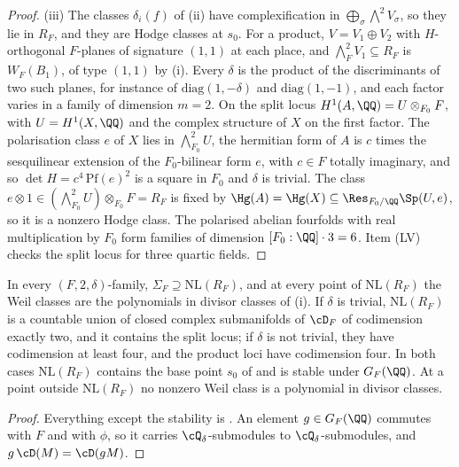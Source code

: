 \begin{proof}
(iii) The classes $\delta_{i}(f)$ of (ii) have
complexification in $\bigoplus_{\sigma}\bigwedge^{2}V_{\sigma}$, so they lie in
$R_{F}$, and they are Hodge classes at $s_{0}$. For a product,
$V=V_{1}\oplus V_{2}$ with $H$-orthogonal $F$-planes of signature $(1,1)$ at
each place, and $\bigwedge^{2}_{F}V_{1}\subseteq R_{F}$ is $W_{F}(B_{1})$, of
type $(1,1)$ by (i). Every $\delta$ is the product of the
discriminants of two such planes, for instance of $\mathrm{diag}(1,-\delta)$
and $\mathrm{diag}(1,-1)$, and each factor varies in a family of dimension
$m=2$. On the split locus $H^{1}(A,\QQ)=U\otimes_{F_{0}}F$, with
$U=H^{1}(X,\QQ)$ and the complex structure of $X$ on the first factor. The
polarisation class $e$ of $X$ lies in $\bigwedge^{2}_{F_{0}}U$, the hermitian
form of $A$ is $c$ times the sesquilinear extension of the $F_{0}$-bilinear
form $e$, with $c\in F$ totally imaginary, and so $\det H=c^{4}\,\mathrm{Pf}(e)^{2}$
is a square in $F_{0}$ and $\delta$ is trivial. The class
$e\otimes1\in(\bigwedge^{2}_{F_{0}}U)\otimes_{F_{0}}F=R_{F}$ is fixed by
$\Hg(A)=\Hg(X)\subseteq\Res_{F_{0}/\QQ}\Sp(U,e)$, so it is a nonzero Hodge
class. The polarised abelian fourfolds with real multiplication by $F_{0}$
form families of dimension $[F_{0}:\QQ]\cdot3=6$. Item (LV) checks the split
locus for three quartic fields.
\end{proof}

\begin{corollary}\label{cor:quarticbase}
In every $(F,2,\delta)$-family, $\Sigma_{F}\supseteq\mathrm{NL}(R_{F})$, and at
every point of $\mathrm{NL}(R_{F})$ the Weil classes are the polynomials in
divisor classes of (i). If $\delta$ is trivial,
$\mathrm{NL}(R_{F})$ is a countable union of closed complex submanifolds of
$\cD_{F}$ of codimension exactly two, and it contains the split locus; if
$\delta$ is not trivial, they have codimension at least four, and the product
loci have codimension four. In both cases $\mathrm{NL}(R_{F})$ contains the
base point $s_{0}$ of  and is stable under
$G_{F}(\QQ)$. At a point outside $\mathrm{NL}(R_{F})$ no nonzero Weil class is
a polynomial in divisor classes.
\end{corollary}

\begin{proof}
Everything except the stability is . An element
$g\in G_{F}(\QQ)$ commutes with $F$ and with $\phi$, so it carries
$\cQ_{\delta}$-submodules to $\cQ_{\delta}$-submodules, and
$g\,\cD(M)=\cD(gM)$.
\end{proof}


